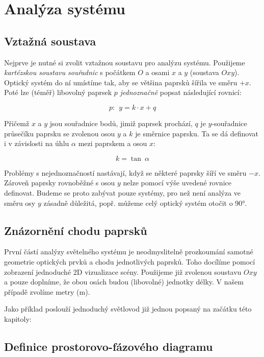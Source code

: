 \section{Analýza systému}

\subsection{Vztažná soustava}

Nejprve je nutné si zvolit vztažnou soustavu pro analýzu systému. Použijeme \emph{kartézskou soustavu souřadnic} s počátkem $O$ a osami $x$ a $y$ (soustava $Oxy$). Optický systém do ní umístíme tak, aby se většina paprsků šířila ve směru $+x$. Poté lze (téměř) libovolný paprsek $p$ \emph{jednoznačně} popsat následující rovnicí:

\[ p:\ \ y = k \cdot x + q \]

Přičemž $x$ a $y$ jsou souřadnice bodů, jimiž paprsek prochází, $q$ je $y$-souřadnice průsečíku paprsku se zvolenou osou $y$ a $k$ je směrnice paprsku. Ta se dá definovat i v závislosti na úhlu $\alpha$ mezi paprskem a osou $x$:

\[ k = \tan\ \alpha \]

Problémy s nejednoznačností nastávají, když se některé paprsky šíří ve směru $-x$. Zároveň paprsky rovnoběžné s osou $y$ nelze pomocí výše uvedené rovnice definovat. Budeme se proto zabývat pouze systémy, pro než není analýza ve směru osy $y$ zásadně důležitá, popř. můžeme celý optický systém otočit o 90°.


\subsection{Znázornění chodu paprsků}
První částí analýzy světelného systému je neodmyslitelně prozkoumání samotné geometrie optických prvků a chodu jednotlivých paprsků. Toho docílíme pomocí zobrazení jednoduché 2D vizualizace scény. Použijeme již zvolenou soustavu $Oxy$ a pouze doplníme, že obou osách budou (libovolné) jednotky délky. V našem případě zvolíme metry ($\mathrm{m}$).

Jako příklad poslouží jednoduchý světlovod již jednou popsaný na začátku této kapitoly:



\subsection{Definice prostorovo-fázového diagramu}

